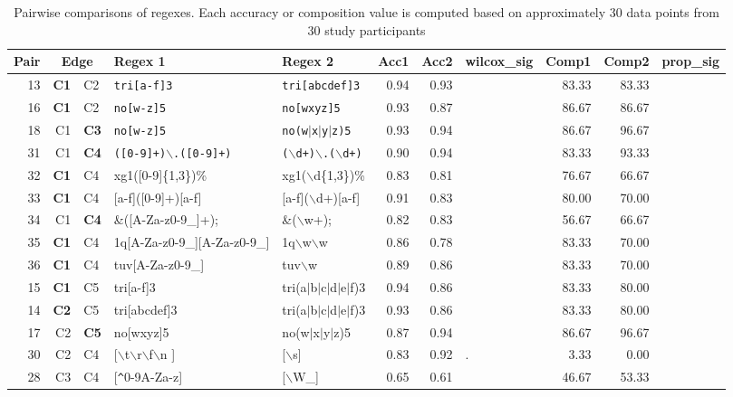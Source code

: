 \begin{table*}[ht]
\centering
\caption{Pairwise comparisons of regexes. Each accuracy or composition value is computed based on approximately 30 data points from 30 study participants}
\begin{tabular}{rr@{ -- }lllrrlrrl}
  \hline
 Pair & \multicolumn{2}{c}{Edge} & Regex 1 & Regex 2 & Acc1 & Acc2 & wilcox\_sig & Comp1 & Comp2 & prop\_sig \\ 
  \hline
13 & {\bf C1} & C2 & {\tt tri[a-f]3} & {\tt tri[abcdef]3} & 0.94 & 0.93 &   & 83.33 & 83.33 &   \\ 
  16 & {\bf C1} & C2 & {\tt no[w-z]5} & {\tt no[wxyz]5} & 0.93 & 0.87 &   & 86.67 & 86.67 &   \\ 
  18 & C1 & {\bf C3} & {\tt no[w-z]5} & {\tt no(w$|$x$|$y$|$z)5} & 0.93 & 0.94 &   & 86.67 & 96.67 &   \\ 
  31 & C1 & {\bf C4} & {\tt ([0-9]+)$\backslash$.([0-9]+)} & {\tt ($\backslash$d+)$\backslash$.($\backslash$d+)} & 0.90 & 0.94 &   & 83.33 & 93.33 &   \\ 
  32 & {\bf C1} & C4 & xg1([0-9]\{1,3\})\% & xg1($\backslash$d\{1,3\})\% & 0.83 & 0.81 &   & 76.67 & 66.67 &   \\ 
  33 & {\bf C1} & C4 & [a-f]([0-9]+)[a-f] & [a-f]($\backslash$d+)[a-f] & 0.91 & 0.83 &   & 80.00 & 70.00 &   \\ 
  34 & C1 & {\bf C4} & \&([A-Za-z0-9\_]+); & \&($\backslash$w+); & 0.82 & 0.83 &   & 56.67 & 66.67 &   \\ 
  35 & {\bf C1} & C4 & 1q[A-Za-z0-9\_][A-Za-z0-9\_] & 1q$\backslash$w$\backslash$w & 0.86 & 0.78 &   & 83.33 & 70.00 &   \\ 
  36 & {\bf C1} & C4 & tuv[A-Za-z0-9\_] & tuv$\backslash$w & 0.89 & 0.86 &   & 83.33 & 70.00 &   \\ 
    15 & {\bf C1} & C5 & tri[a-f]3 & tri(a$|$b$|$c$|$d$|$e$|$f)3 & 0.94 & 0.86 &   & 83.33 & 80.00 &   \\ 
  14 & {\bf C2} & C5 & tri[abcdef]3 & tri(a$|$b$|$c$|$d$|$e$|$f)3 & 0.93 & 0.86 &   & 83.33 & 80.00 &   \\ 
  17 & C2 & {\bf C5} & no[wxyz]5 & no(w$|$x$|$y$|$z)5 & 0.87 & 0.94 &   & 86.67 & 96.67 &   \\ 
  30 & C2 & C4 & [$\backslash$t$\backslash$r$\backslash$f$\backslash$n ] & [$\backslash$s] & 0.83 & 0.92 & . & 3.33 & 0.00 &   \\ 
  28 & C3 & C4 & [\verb|^|0-9A-Za-z] & [$\backslash$W\_] & 0.65 & 0.61 &   & 46.67 & 53.33 &   \\ 

\end{tabular}
\end{table*}
